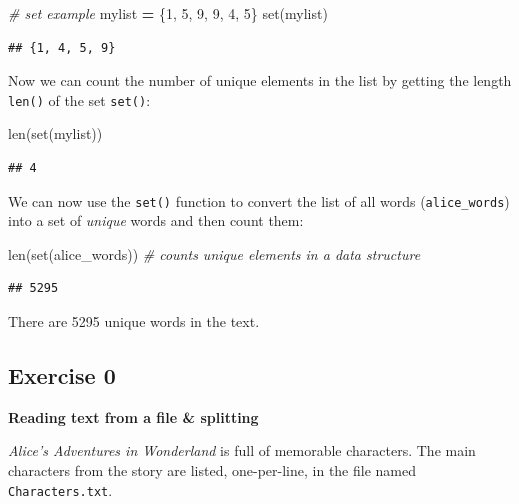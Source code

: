 \documentclass[]{book}
\newenvironment{Shaded}{\begin{snugshade}}{\end{snugshade}}
\newcommand{\BuiltInTok}[1]{#1}
\newcommand{\CommentTok}[1]{\textcolor[rgb]{0.56,0.35,0.01}{\textit{#1}}}
\newcommand{\DecValTok}[1]{\textcolor[rgb]{0.00,0.00,0.81}{#1}}
\newcommand{\NormalTok}[1]{#1}
\newcommand{\OperatorTok}[1]{\textcolor[rgb]{0.81,0.36,0.00}{\textbf{#1}}}
\begin{document}
\begin{Shaded}
\begin{Highlighting}[]
\CommentTok{# set example}
\NormalTok{mylist }\OperatorTok{=}\NormalTok{ \{}\DecValTok{1}\NormalTok{, }\DecValTok{5}\NormalTok{, }\DecValTok{9}\NormalTok{, }\DecValTok{9}\NormalTok{, }\DecValTok{4}\NormalTok{, }\DecValTok{5}\NormalTok{\}}
\BuiltInTok{set}\NormalTok{(mylist)}
\end{Highlighting}
\end{Shaded}

\begin{verbatim}
## {1, 4, 5, 9}
\end{verbatim}

Now we can count the number of unique elements in the list by getting the length \texttt{len()} of the set \texttt{set()}:

\begin{Shaded}
\begin{Highlighting}[]
\BuiltInTok{len}\NormalTok{(}\BuiltInTok{set}\NormalTok{(mylist))}
\end{Highlighting}
\end{Shaded}

\begin{verbatim}
## 4
\end{verbatim}

We can now use the \texttt{set()} function to convert the list of all words (\texttt{alice\_words}) into a set of \emph{unique} words and then count them:

\begin{Shaded}
\begin{Highlighting}[]
\BuiltInTok{len}\NormalTok{(}\BuiltInTok{set}\NormalTok{(alice_words)) }\CommentTok{# counts unique elements in a data structure}
\end{Highlighting}
\end{Shaded}

\begin{verbatim}
## 5295
\end{verbatim}

There are 5295 unique words in the text.

\hypertarget{exercise-0-3}{%
\subsection{Exercise 0}\label{exercise-0-3}}

\textbf{Reading text from a file \& splitting}

\emph{Alice's Adventures in Wonderland} is full of memorable characters. The main characters from the story are listed, one-per-line, in the file named \texttt{Characters.txt}.
\end{document}
